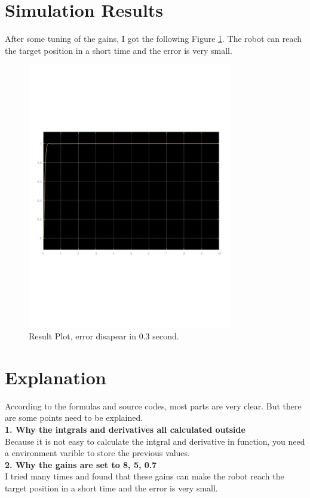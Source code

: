 \documentclass{article}
\begin{document}
\section{Simulation Results}

After some tuning of the gains, I got the following Figure \ref{fig:result_plot}. The robot can reach the target position in a short time and the error is very small.\\

\begin{figure}[ht]
    \centering
    \includegraphics[width=0.8\textwidth]{figures/result.pdf}
    \caption{Result Plot, error disapear in 0.3 second.}
    \label{fig:result_plot}
\end{figure}

\section{Explanation}

According to the formulas and source codes, most parts are very clear. But there are some points need to be explained.\\
\textbf{1. Why the intgrals and derivatives all calculated outside} \\
Because it is not easy to calculate the intgral and derivative in function, you need a environment varible to store the previous values.\\
\textbf{2. Why the gains are set to 8, 5, 0.7} \\
I tried many times and found that these gains can make the robot reach the target position in a short time and the error is very small.\\
\end{document}
